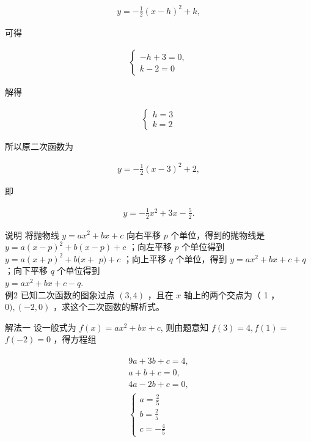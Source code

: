 \documentclass[10pt]{article}
\begin{document}
\begin{align*}
y=-\frac{1}{2}(x-h)^{2}+k,
\end{align*}

可得

\begin{align*}
\left\{\begin{array}{l}
-h+3=0, \\
k-2=0
\end{array}\right.
\end{align*}

解得

\begin{align*}
\left\{\begin{array}{l}
h=3 \\
k=2
\end{array}\right.
\end{align*}

所以原二次函数为

\begin{align*}
y=-\frac{1}{2}(x-3)^{2}+2,
\end{align*}

即

\begin{align*}
y=-\frac{1}{2} x^{2}+3 x-\frac{5}{2} .
\end{align*}

说明 将抛物线 $y=a x^{2}+b x+c$ 向右平移 $p$ 个单位，得到的抛物线是 $y=a(x-p)^{2}+b(x-p)+c$ ；向左平移 $p$ 个单位得到 $y=a(x+p)^{2}+b(x+$ $p)+c$ ；向上平移 $q$ 个单位，得到 $y=a x^{2}+b x+c+q$ ；向下平移 $q$ 个单位得到\\
$y=a x^{2}+b x+c-q$.\\
例2 已知二次函数的图象过点 $(3,4)$ ，且在 $x$ 轴上的两个交点为（ 1 ， $0),(-2,0)$ ，求这个二次函数的解析式。

解法一 设一般式为 $f(x)=a x^{2}+b x+c$, 则由题意知 $f(3)=4, f(1)=$ $f(-2)=0$ ，得方程组

\begin{align*}
\begin{gathered}
9 a+3 b+c=4, \\
a+b+c=0, \\
4 a-2 b+c=0, \\
\left\{\begin{array}{l}
a=\frac{2}{5} \\
b=\frac{2}{5} \\
c=-\frac{4}{5}
\end{array}\right.
\end{gathered}
\end{align*}
\end{document}
